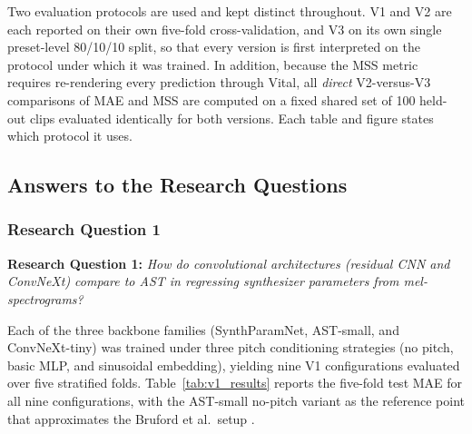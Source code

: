 \noindent
Two evaluation protocols are used and kept distinct throughout. V1 and V2 are each reported on their own five-fold cross-validation, and V3 on its own single preset-level 80/10/10 split, so that every version is first interpreted on the protocol under which it was trained. In addition, because the MSS metric requires re-rendering every prediction through Vital, all \emph{direct} V2-versus-V3 comparisons of MAE and MSS are computed on a fixed shared set of 100 held-out clips evaluated identically for both versions. Each table and figure states which protocol it uses.

\subsection{Answers to the Research Questions}
\label{subsec:rq_answers}

\subsubsection{Research Question 1}
\label{subsec:rq1}

\noindent
\textbf{Research Question 1:} \textit{How do convolutional architectures (residual CNN and ConvNeXt) compare to AST in regressing synthesizer parameters from mel-spectrograms?}

\noindent \newline
Each of the three backbone families (SynthParamNet, AST-small, and ConvNeXt-tiny) was trained under three pitch conditioning strategies (no pitch, basic MLP, and sinusoidal embedding), yielding nine V1 configurations evaluated over five stratified folds. Table~\ref{tab:v1_results} reports the five-fold test MAE for all nine configurations, with the AST-small no-pitch variant as the reference point that approximates the Bruford et al.\ setup \cite{bruford2024ast}.

